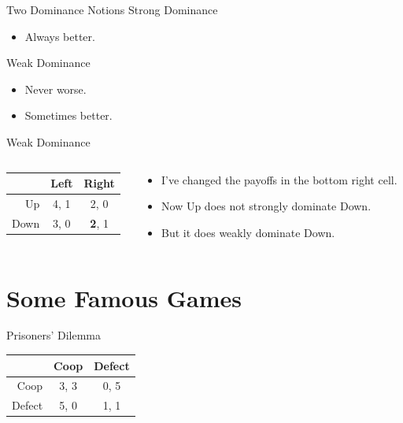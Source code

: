 \documentclass[
  14pt,
  letterpaper,
  ignorenonframetext,
  aspectratio=169,
  handout]{beamer}
\providecommand{\tightlist}{%
  \setlength{\itemsep}{0pt}\setlength{\parskip}{0pt}}\usepackage{longtable,booktabs,array}
\let\olditem\item
\renewcommand{\item}{%
\olditem\vspace{6pt}}
\begin{document}
\begin{frame}{Two Dominance Notions}
\protect\hypertarget{two-dominance-notions}{}
Strong Dominance

\begin{itemize}
\tightlist
\item
  Always better.
\end{itemize}

Weak Dominance

\begin{itemize}
\tightlist
\item
  Never worse.
\item
  Sometimes better.
\end{itemize}
\end{frame}

\begin{frame}[fragile]{Weak Dominance}
\protect\hypertarget{weak-dominance-1}{}
\begin{columns}[T]
\begin{column}{0.4\textwidth}
\begin{table}[!h]
\centering
\begin{tabular}[t]{>{}r|cc}
\toprule
 & Left & Right\\
\midrule
Up & 4, 1 & 2, 0\\
Down & 3, 0 & \textbf{2}, 1\\
\bottomrule
\end{tabular}
\end{table}
\end{column}

\begin{column}{0.6\textwidth}
\begin{itemize}
\tightlist
\item
  I've changed the payoffs in the bottom right cell.
\item
  Now Up does not strongly dominate Down.
\item
  But it does weakly dominate Down.
\end{itemize}
\end{column}
\end{columns}
\end{frame}

\hypertarget{some-famous-games}{%
\section{Some Famous Games}\label{some-famous-games}}

\begin{frame}[fragile]{Prisoners' Dilemma}
\protect\hypertarget{prisoners-dilemma}{}
\begin{table}[!h]
\centering
\begin{tabular}[t]{>{}r|cc}
\toprule
 & Coop & Defect\\
\midrule
Coop & 3, 3 & 0, 5\\
Defect & 5, 0 & 1, 1\\
\bottomrule
\end{tabular}
\end{table}
\end{frame}
\end{document}
